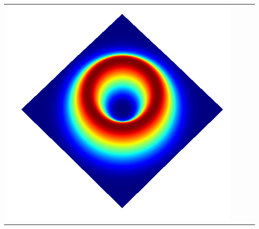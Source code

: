 \documentclass[a4paper, 12pt]{article}
\begin{document}
\begin{center}
\begin{tabular}{M{1.5cm}M{5cm}M{5cm}M{5cm}}
\includegraphics[width=\linewidth]{../resources/intensity_M=2.png}\\
\end{tabular}
\end{center}
\end{document}
